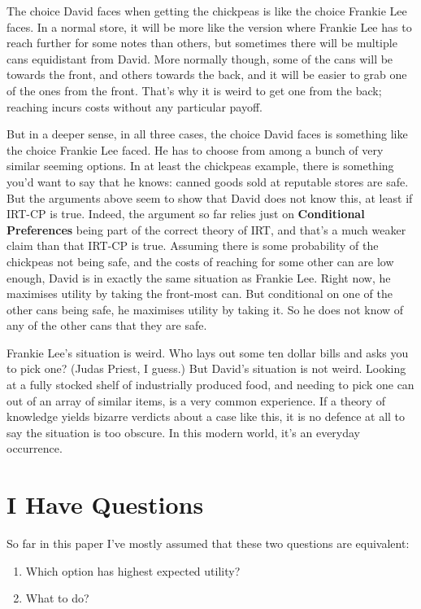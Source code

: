 \documentclass[
  12pt,
]{article}
\providecommand{\tightlist}{%
  \setlength{\itemsep}{0pt}\setlength{\parskip}{0pt}}
\begin{document}
The choice David faces when getting the chickpeas is like the choice Frankie Lee faces. In a normal store, it will be more like the version where Frankie Lee has to reach further for some notes than others, but sometimes there will be multiple cans equidistant from David. More normally though, some of the cans will be towards the front, and others towards the back, and it will be easier to grab one of the ones from the front. That's why it is weird to get one from the back; reaching incurs costs without any particular payoff.

But in a deeper sense, in all three cases, the choice David faces is something like the choice Frankie Lee faced. He has to choose from among a bunch of very similar seeming options. In at least the chickpeas example, there is something you'd want to say that he knows: canned goods sold at reputable stores are safe. But the arguments above seem to show that David does not know this, at least if IRT-CP is true. Indeed, the argument so far relies just on \textbf{Conditional Preferences} being part of the correct theory of IRT, and that's a much weaker claim than that IRT-CP is true. Assuming there is some probability of the chickpeas not being safe, and the costs of reaching for some other can are low enough, David is in exactly the same situation as Frankie Lee. Right now, he maximises utility by taking the front-most can. But conditional on one of the other cans being safe, he maximises utility by taking it. So he does not know of any of the other cans that they are safe.

Frankie Lee's situation is weird. Who lays out some ten dollar bills and asks you to pick one? (Judas Priest, I guess.) But David's situation is not weird. Looking at a fully stocked shelf of industrially produced food, and needing to pick one can out of an array of similar items, is a very common experience. If a theory of knowledge yields bizarre verdicts about a case like this, it is no defence at all to say the situation is too obscure. In this modern world, it's an everyday occurrence.

\hypertarget{supermarketquestions}{%
\section{I Have Questions}\label{supermarketquestions}}

So far in this paper I've mostly assumed that these two questions are equivalent:

\begin{enumerate}
\def\labelenumi{\arabic{enumi}.}
\tightlist
\item
  Which option has highest expected utility?
\item
  What to do?
\end{enumerate}
\end{document}
